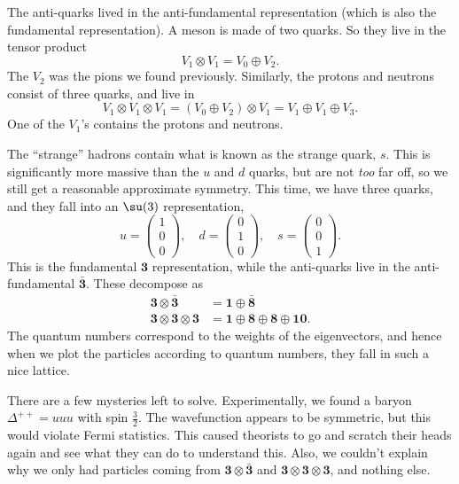 \documentclass[a4paper]{article}
\begin{document}
The anti-quarks lived in the anti-fundamental representation (which is also the fundamental representation). A meson is made of two quarks. So they live in the tensor product
\[
  V_1 \otimes V_1 = V_0 \oplus V_2.
\]
The $V_2$ was the pions we found previously. Similarly, the protons and neutrons consist of three quarks, and live in
\[
  V_1 \otimes V_1 \otimes V_1 = (V_0 \oplus V_2) \otimes V_1 = V_1 \oplus V_1 \oplus V_3.
\]
One of the $V_1$'s contains the protons and neutrons.

The ``strange'' hadrons contain what is known as the strange quark, $s$. This is significantly more massive than the $u$ and $d$ quarks, but are not \emph{too} far off, so we still get a reasonable approximate symmetry. This time, we have three quarks, and they fall into an $\su(3)$ representation,
\[
  u =
  \begin{pmatrix}
    1 \\ 0 \\ 0
  \end{pmatrix},\quad
  d =
  \begin{pmatrix}
    0 \\ 1 \\ 0
  \end{pmatrix},\quad
  s =
  \begin{pmatrix}
    0 \\ 0 \\ 1
  \end{pmatrix}.
\]
This is the fundamental $\mathbf{3}$ representation, while the anti-quarks live in the anti-fundamental $\bar{\mathbf{3}}$. These decompose as
\begin{align*}
  \mathbf{3} \otimes \bar{\mathbf{3}} &= \mathbf{1} \oplus \bar{\mathbf{8}}\\
  \mathbf{3} \otimes \mathbf{3} \otimes \mathbf{3} &= \mathbf{1} \oplus \mathbf{8} \oplus \mathbf{8} \oplus \mathbf{10}.
\end{align*}
The quantum numbers correspond to the weights of the eigenvectors, and hence when we plot the particles according to quantum numbers, they fall in such a nice lattice.

There are a few mysteries left to solve. Experimentally, we found a baryon $\Delta^{++} = uuu$ with spin $\frac{3}{2}$. The wavefunction appears to be symmetric, but this would violate Fermi statistics. This caused theorists to go and scratch their heads again and see what they can do to understand this. Also, we couldn't explain why we only had particles coming from $\mathbf{3} \otimes \bar{\mathbf{3}}$ and $\mathbf{3} \otimes \mathbf{3} \otimes \mathbf{3}$, and nothing else.
\end{document}
